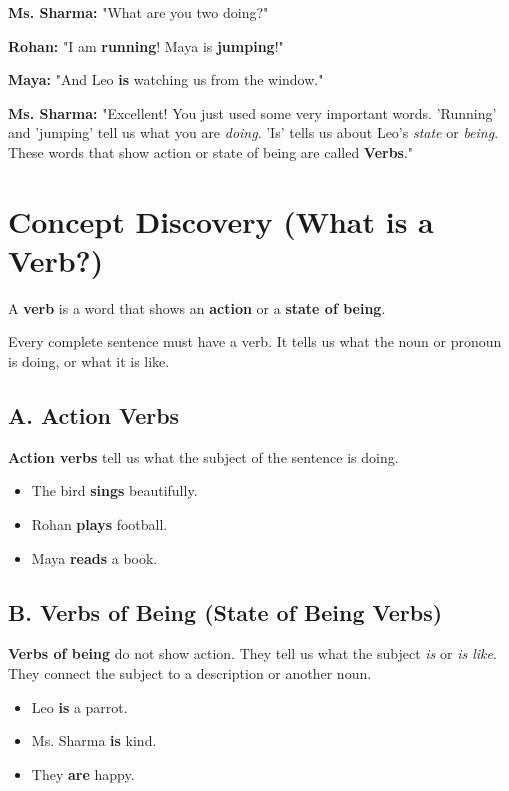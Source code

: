 \textbf{Ms. Sharma:} "What are you two doing?"

\textbf{Rohan:} "I am \textbf{running}! Maya is \textbf{jumping}!"

\textbf{Maya:} "And Leo \textbf{is} watching us from the window."

\textbf{Ms. Sharma:} "Excellent! You just used some very important words. 'Running' and 'jumping' tell us what you are \textit{doing}. 'Is' tells us about Leo's \textit{state} or \textit{being}. These words that show action or state of being are called \textbf{Verbs}."

\section{Concept Discovery (What is a Verb?)}
A \textbf{verb} is a word that shows an \textbf{action} or a \textbf{state of being}.

Every complete sentence must have a verb. It tells us what the noun or pronoun is doing, or what it is like.

\subsection*{A. Action Verbs}
\textbf{Action verbs} tell us what the subject of the sentence is doing.

\begin{itemize}
    \item The bird \textbf{sings} beautifully.
    \item Rohan \textbf{plays} football.
    \item Maya \textbf{reads} a book.
\end{itemize}

\subsection*{B. Verbs of Being (State of Being Verbs)}
\textbf{Verbs of being} do not show action. They tell us what the subject \textit{is} or \textit{is like}. They connect the subject to a description or another noun.

\begin{itemize}
    \item Leo \textbf{is} a parrot.
    \item Ms. Sharma \textbf{is} kind.
    \item They \textbf{are} happy.
\end{itemize}

